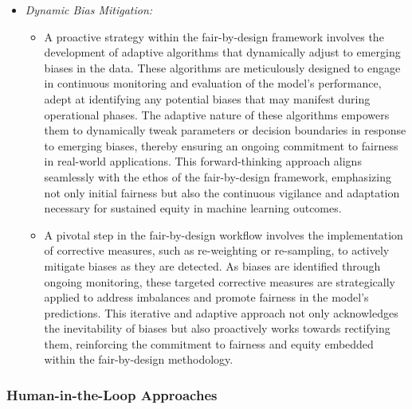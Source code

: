 \documentclass[12pt,a4paper,openright,twoside]{book}
\begin{document}
\begin{itemize}
    
    \item \emph{Dynamic Bias Mitigation:}
    
    \begin{itemize}
    
        \item A proactive strategy within the fair-by-design framework involves the development of adaptive algorithms that dynamically adjust to emerging biases in the data. These algorithms are meticulously designed to engage in continuous monitoring and evaluation of the model's performance, adept at identifying any potential biases that may manifest during operational phases. The adaptive nature of these algorithms empowers them to dynamically tweak parameters or decision boundaries in response to emerging biases, thereby ensuring an ongoing commitment to fairness in real-world applications. This forward-thinking approach aligns seamlessly with the ethos of the fair-by-design framework, emphasizing not only initial fairness but also the continuous vigilance and adaptation necessary for sustained equity in machine learning outcomes.

        \item A pivotal step in the fair-by-design workflow involves the implementation of corrective measures, such as re-weighting or re-sampling, to actively mitigate biases as they are detected. As biases are identified through ongoing monitoring, these targeted corrective measures are strategically applied to address imbalances and promote fairness in the model's predictions. This iterative and adaptive approach not only acknowledges the inevitability of biases but also proactively works towards rectifying them, reinforcing the commitment to fairness and equity embedded within the fair-by-design methodology.

    \end{itemize}

\end{itemize}

\subsubsection{Human-in-the-Loop Approaches}
\end{document}
